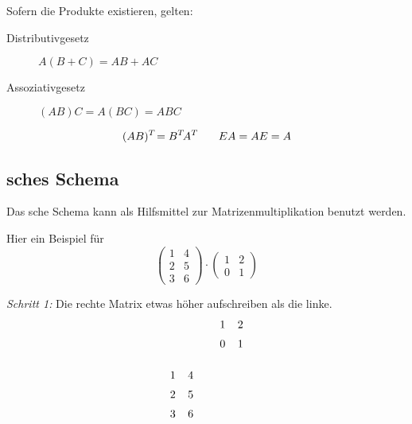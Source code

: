Sofern die Produkte existieren, gelten:
\begin{description}
  \item [{Distributivgesetz}] 
	$A(B+C)=AB+AC$
  \item [{Assoziativgesetz}] 
	$(AB)C=A(BC)=ABC$
\end{description}
\[
    (AB)\T=B\T A\T \qquad EA=AE=A
\]

\subsection{\protect{}sches Schema}

Das sche Schema kann als Hilfsmittel zur Matrizenmultiplikation benutzt werden.

Hier ein Beispiel für 
\[
\begin{pmatrix}
  1 & 4\\
  2 & 5\\
  3 & 6
\end{pmatrix}
\cdot
\begin{pmatrix}
  1 & 2\\
  0 & 1
\end{pmatrix}
\]


\vbox{
\emph{Schritt 1:} Die rechte Matrix etwas höher aufschreiben als die linke.
\[
\xySep{5pt}\xymatrix{
                &  & \,\ar@{-}[ddddd] & 1 & 2 \\
                &  &                  & 0 & 1 \\
\,\ar@{-}[rrrr] &  &                  &   & \,\\
1               & 4\\
2               & 5\\
3               & 6                   & \,
}
\]
}

\bigskip{}

